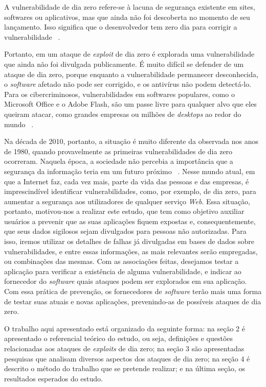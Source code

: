 A vulnerabilidade de dia zero refere-se à lacuna de segurança existente em sites, softwares ou aplicativos, mas que ainda não foi descoberta no momento de seu lançamento. Isso significa que o desenvolvedor tem zero dia para corrigir a vulnerabilidade ~\cite{Kumar:2016}.

Portanto, em um ataque de \textit{exploit} de dia zero é explorada uma vulnerabilidade que ainda não foi divulgada publicamente. É muito difícil se defender de um ataque de dia zero, porque enquanto a vulnerabilidade permanecer desconhecida, o \textit{software} afetado não pode ser corrigido, e os antivírus não podem detectá-lo. Para os cibercriminosos, vulnerabilidades em softwares populares, como o Microsoft Office e o Adobe Flash, são um passe livre para qualquer alvo que eles queiram atacar, como grandes empresas ou milhões de \textit{desktops} ao redor do mundo ~\cite{Bilge:2012}. 

Na década de 2010, portanto, a situação é muito diferente da observada nos anos de 1980, quando provavelmente as primeiras vulnerabilidades de dia zero ocorreram. Naquela época, a sociedade não percebia a importância que a segurança da informação teria em um futuro próximo ~\cite{Fotiet:2015}. Nesse mundo atual, em que a Internet faz, cada vez mais, parte da vida das pessoas e das empresas, é imprescindível identificar vulnerabilidades, como, por exemplo, de dia zero, para aumentar a segurança aos utilizadores de qualquer serviço \textit{Web}. Essa situação, portanto, motivou-nos a realizar este estudo, que tem como objetivo auxiliar usuários a prevenir que as suas aplicações fiquem expostas e, consequentemente, que seus dados sigilosos sejam divulgados para pessoas não autorizadas. Para isso, iremos utilizar os detalhes de falhas já divulgadas em bases de dados sobre vulnerabilidades, e entre essas informações, as mais relevantes serão empregadas, ou combinações das mesmas. Com as associações feitas, desejamos testar a aplicação para verificar a existência de alguma vulnerabilidade, e indicar ao fornecedor do \textit{software} quais ataques podem ser explorados em sua aplicação. Com essa prática de prevenção, os fornecedores de \textit{software} terão mais uma forma de testar suas atuais e novas aplicações, prevenindo-as de possíveis ataques de dia zero.

O trabalho aqui apresentado está organizado da seguinte forma: na seção 2 é apresentado o referencial teórico do estudo, ou seja, definições e questões relacionadas aos ataques de \textit{exploits} de dia zero; na seção 3 são apresentadas pesquisas que analisam diversos aspectos dos ataques de dia zero; na seção 4 é descrito o método do trabalho que se pretende realizar; e na última seção, os resultados esperados do estudo.